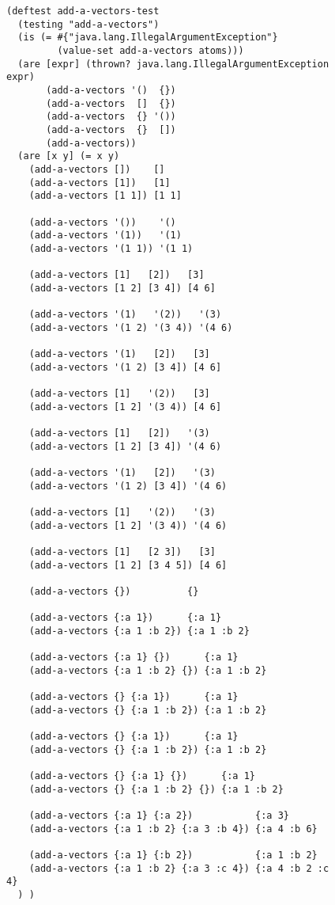 \documentclass[11pt]{article}
\begin{document}
\begin{figure}[H]
\label{add-a-vectors-test}
\begin{verbatim}
(deftest add-a-vectors-test
  (testing "add-a-vectors")
  (is (= #{"java.lang.IllegalArgumentException"}
         (value-set add-a-vectors atoms)))
  (are [expr] (thrown? java.lang.IllegalArgumentException expr)
       (add-a-vectors '()  {})
       (add-a-vectors  []  {})
       (add-a-vectors  {} '())
       (add-a-vectors  {}  [])
       (add-a-vectors))
  (are [x y] (= x y)
    (add-a-vectors [])    []
    (add-a-vectors [1])   [1]
    (add-a-vectors [1 1]) [1 1]

    (add-a-vectors '())    '()
    (add-a-vectors '(1))   '(1)
    (add-a-vectors '(1 1)) '(1 1)

    (add-a-vectors [1]   [2])   [3]
    (add-a-vectors [1 2] [3 4]) [4 6]

    (add-a-vectors '(1)   '(2))   '(3)
    (add-a-vectors '(1 2) '(3 4)) '(4 6)

    (add-a-vectors '(1)   [2])   [3]
    (add-a-vectors '(1 2) [3 4]) [4 6]

    (add-a-vectors [1]   '(2))   [3]
    (add-a-vectors [1 2] '(3 4)) [4 6]

    (add-a-vectors [1]   [2])   '(3)
    (add-a-vectors [1 2] [3 4]) '(4 6)

    (add-a-vectors '(1)   [2])   '(3)
    (add-a-vectors '(1 2) [3 4]) '(4 6)

    (add-a-vectors [1]   '(2))   '(3)
    (add-a-vectors [1 2] '(3 4)) '(4 6)

    (add-a-vectors [1]   [2 3])   [3]
    (add-a-vectors [1 2] [3 4 5]) [4 6]

    (add-a-vectors {})          {}

    (add-a-vectors {:a 1})      {:a 1}
    (add-a-vectors {:a 1 :b 2}) {:a 1 :b 2}

    (add-a-vectors {:a 1} {})      {:a 1}
    (add-a-vectors {:a 1 :b 2} {}) {:a 1 :b 2}

    (add-a-vectors {} {:a 1})      {:a 1}
    (add-a-vectors {} {:a 1 :b 2}) {:a 1 :b 2}

    (add-a-vectors {} {:a 1})      {:a 1}
    (add-a-vectors {} {:a 1 :b 2}) {:a 1 :b 2}

    (add-a-vectors {} {:a 1} {})      {:a 1}
    (add-a-vectors {} {:a 1 :b 2} {}) {:a 1 :b 2}

    (add-a-vectors {:a 1} {:a 2})           {:a 3}
    (add-a-vectors {:a 1 :b 2} {:a 3 :b 4}) {:a 4 :b 6}

    (add-a-vectors {:a 1} {:b 2})           {:a 1 :b 2}
    (add-a-vectors {:a 1 :b 2} {:a 3 :c 4}) {:a 4 :b 2 :c 4}
  ) )
\end{verbatim}
\end{figure}
\end{document}
